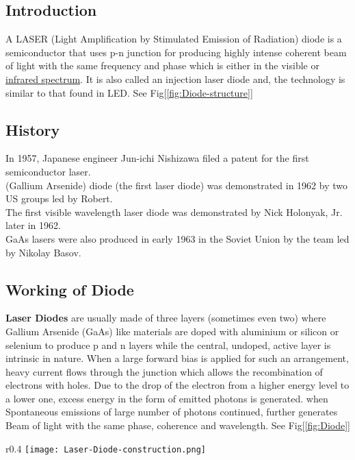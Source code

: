 \documentclass[12pt]{article}
\begin{document}
 
 \subsection{Introduction}
 
 A LASER (Light Amplification by Stimulated Emission of Radiation) diode is a semiconductor that uses p-n junction for producing highly intense coherent beam of light with the same frequency and phase which is either in the visible or \href{https://en.wikipedia.org/wiki/Infrared}{infrared spectrum}. It is also called an injection laser diode and, the technology is similar to that found in LED.
See Fig[\ref{fig:Diode-structure}]
\subsection{History}
\vspace{-2mm}
 In 1957, Japanese engineer Jun-ichi Nishizawa filed a patent for the first semiconductor laser\cite{wiki:Laser_diode}.\\
 (Gallium Arsenide) diode (the first laser diode) was demonstrated in 1962 by two US groups led by Robert.\\
 The first visible wavelength laser diode was demonstrated by Nick Holonyak, Jr. later in 1962.\\
 GaAs lasers were also produced in early 1963 in the Soviet Union by the team led by Nikolay Basov.

 \subsection{Working of Diode}
  
  \textbf{Laser Diodes} are usually made of three layers (sometimes even two) where Gallium Arsenide (GaAs) like materials are doped with aluminium or silicon or selenium to produce p and n layers while the central, undoped, active layer is intrinsic in nature. When a large forward bias is applied for such an arrangement, heavy current flows through the junction which allows the recombination of electrons with holes. Due to the drop of the electron from a higher energy level to a lower one, excess energy in the form of emitted photons is generated. when Spontaneous emissions of large number of photons continued, further generates Beam of light with the same phase, coherence and wavelength. See Fig[\ref{fig:Diode}]
  
  
\begin{wrapfigure}{r}{0.4\textwidth}
\centering
\hspace{-1.2cm} \vspace{-2mm}
    \texttt{[image: Laser-Diode-construction.png]}
    \caption{ Diode Structure}
    \label{fig:Diode-structure}
\end{wrapfigure}
  
\end{document}
